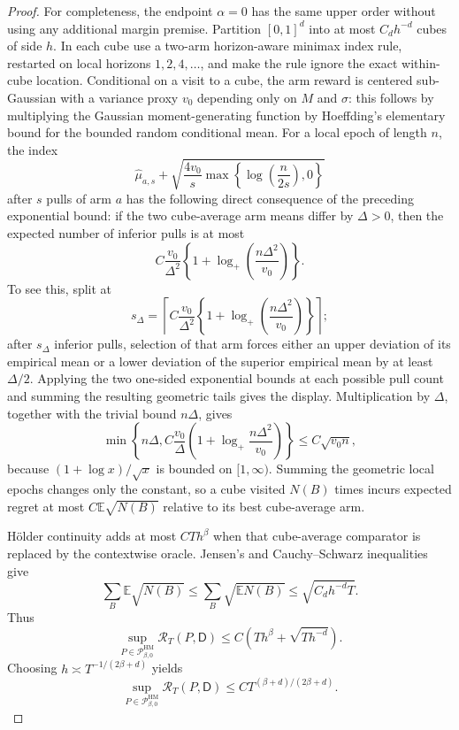 \documentclass{article}
\begin{document}
\begin{proof}
For completeness, the endpoint \(\alpha=0\) has the same upper order without using any additional margin premise.  Partition \([0,1]^d\) into at most \(C_dh^{-d}\) cubes of side \(h\).  In each cube use a two-arm horizon-aware minimax index rule, restarted on local horizons \(1,2,4,\ldots\), and make the rule ignore the exact within-cube location.  Conditional on a visit to a cube, the arm reward is centered sub-Gaussian with a variance proxy \(v_0\) depending only on \(M\) and \(\sigma\): this follows by multiplying the Gaussian moment-generating function by Hoeffding's elementary bound for the bounded random conditional mean.  For a local epoch of length \(n\), the index
\[
 \widehat\mu_{a,s}
 +\sqrt{\frac{4v_0}{s}
 \max\!\left\{\log\!\left(\frac{n}{2s}\right),0\right\}}
\]
after \(s\) pulls of arm \(a\) has the following direct consequence of the preceding exponential bound: if the two cube-average arm means differ by \(\Delta>0\), then the expected number of inferior pulls is at most
\[
 C\frac{v_0}{\Delta^2}
 \left\{1+\log_+\!\left(\frac{n\Delta^2}{v_0}\right)\right\}.
\]
To see this, split at
\[
 s_\Delta=\left\lceil
 C\frac{v_0}{\Delta^2}
 \left\{1+\log_+\!\left(\frac{n\Delta^2}{v_0}\right)\right\}
 \right\rceil;
\]
after \(s_\Delta\) inferior pulls, selection of that arm forces either an upper deviation of its empirical mean or a lower deviation of the superior empirical mean by at least \(\Delta/2\).  Applying the two one-sided exponential bounds at each possible pull count and summing the resulting geometric tails gives the display.  Multiplication by \(\Delta\), together with the trivial bound \(n\Delta\), gives
\[
 \min\!\left\{n\Delta,
 C\frac{v_0}{\Delta}
 \left(1+\log_+\!\frac{n\Delta^2}{v_0}\right)\right\}
 \leq C\sqrt{v_0n},
\]
because \((1+\log x)/\sqrt{x}\) is bounded on \([1,\infty)\).  Summing the geometric local epochs changes only the constant, so a cube visited \(N(B)\) times incurs expected regret at most \(C\mathbb E\sqrt{N(B)}\) relative to its best cube-average arm.

H\"older continuity adds at most \(CTh^\beta\) when that cube-average comparator is replaced by the contextwise oracle.  Jensen's and Cauchy--Schwarz inequalities give
\[
 \sum_B\mathbb E\sqrt{N(B)}
 \leq\sum_B\sqrt{\mathbb EN(B)}
 \leq\sqrt{C_dh^{-d}T}.
\]
Thus
\[
 \sup_{P\in\mathcal P_{\beta,0}^{\mathrm{HM}}}
 \mathcal R_T(P,\mathsf D)
 \leq C\left(Th^\beta+\sqrt{Th^{-d}}\right).
\]
Choosing \(h\asymp T^{-1/(2\beta+d)}\) yields
\[
 \sup_{P\in\mathcal P_{\beta,0}^{\mathrm{HM}}}
 \mathcal R_T(P,\mathsf D)
 \leq CT^{(\beta+d)/(2\beta+d)}.
\]


\end{proof}
\end{document}
